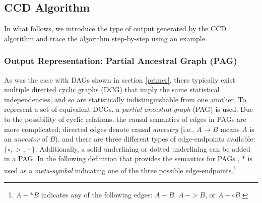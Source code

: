 \documentclass[11pt]{article}
\begin{document}
\subsection{CCD Algorithm}
In what follows, we introduce the type of output generated by the CCD algorithm and trace the algorithm step-by-step using an example. 


\subsubsection{Output Representation: Partial Ancestral Graph (PAG)}
As was the case with DAGs shown in section \ref{primer}, there typically exist multiple directed cyclic graphs (DCG) that imply the same statistical independencies, and so are statistically indistinguishable from one another. To represent a set of equivalent DCGs, a \textit{partial ancestral graph} (PAG) is used. Due to the possibility of cyclic relations, the causal semantics of edges in PAGs are more complicated; directed edges denote causal \textit{ancestry} (i.e., $A \rightarrow B$ means $A$ is an \textit{ancestor} of $B$), and there are three different types of edge-endpoints available: $\{ \circ, > , -  \}$. Additionally, a solid underlining or dotted underlining can be added in a PAG. In the following definition that provides the semantics for PAGs \citep{Richardson1996a}, $*$ is used as a \textit{meta-symbol} indicating one of the three possible edge-endpoints.\footnote{$A -*B$ indicates any of the following edges: $A-B$, $A\,->B$, or $A-\circ B$.}

\end{document}

